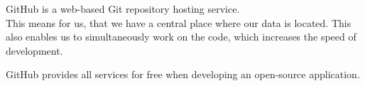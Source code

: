 GitHub is a web-based Git repository hosting service. \cite{github} \\
This means for us, that we have a central place where our data is located. This also enables us to simultaneously work on the code, which increases the speed of development.  

GitHub provides all services for free when developing an open-source application. \cite{githubprice}  
